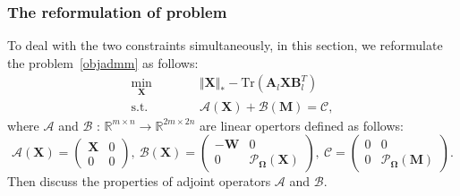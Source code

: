 \documentclass[fontset=windows]{article}
\begin{document}
{\subsubsection{The reformulation of problem }
To deal with the two constraints simultaneously, in this section, we reformulate the problem~\ref{objadmm} as follows:
\begin{equation}
    \begin{aligned}
        \underset{\mathbf X}{\min}\qquad&\quad \Vert\mathbf X \Vert_* - \text{Tr}(\mathbf A_l\mathbf X\mathbf B_l^T) \\
        \text{s.t.}\qquad&\quad   \mathcal{A}(\mathbf X) + \mathcal{B}(\mathbf M) = \mathcal{C},
    \end{aligned}\label{apobj}
\end{equation}
where $\mathcal{A}$ and $\mathcal{B}$ : $\mathbb{R}^{m\times n} \rightarrow \mathbb{R}^{2m\times 2n}$ are linear opertors defined as follows:
\begin{equation*}
    \mathcal{A}(\mathbf X) = \begin{pmatrix}
        \mathbf X & 0 \\
        0 & 0
    \end{pmatrix}, \
    \mathcal{B}(\mathbf X) = \begin{pmatrix}
        -\mathbf W & 0 \\
        0 & \mathcal{P}_{\mathbf\Omega}(\mathbf X)
    \end{pmatrix}, \ 
    \mathcal{C} = \begin{pmatrix}
        0 & 0 \\
        0 & \mathcal{P}_{\mathbf\Omega}(\mathbf M)
    \end{pmatrix}.
\end{equation*}
Then discuss the properties of adjoint operators $\mathcal{A}$ and $\mathcal{B}$.

}
\end{document}
